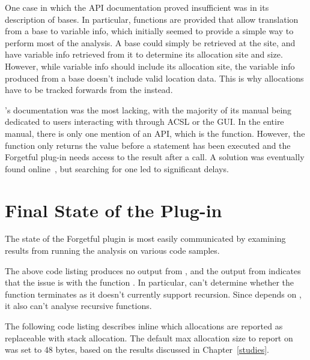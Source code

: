 One case in which the API documentation proved insufficient was in its description of bases. In particular, functions are provided that allow translation from a base to variable info, which initially seemed to provide a simple way to perform most of the analysis. A base could simply be retrieved at the \free{} site, and have variable info retrieved from it to determine its allocation site and size. However, while variable info should include its allocation site, the variable info produced from a base doesn't include valid location data. This is why allocations have to be tracked forwards from the \malloc{} instead.

's documentation was the most lacking, with the majority of its manual being dedicated to users interacting with  through ACSL or the  GUI\@. In the entire manual, there is only one mention of an  API, which is the  function. However, the  function only returns the value before a statement has been executed and the Forgetful plug-in needs access to the result after a \malloc{} call. A solution was eventually found online~\cite{foldstate}, but searching for one led to significant delays.

\section{Final State of the Plug-in}\label{pluginstate}

The state of the Forgetful plugin is most easily communicated by examining results from running the analysis on various code samples.



The above code listing produces no output from , and the output from  indicates that the issue is with the function . In particular,  can't determine whether the function terminates as it doesn't currently support recursion. Since  depends on , it also can't analyse recursive functions.

The following code listing describes inline which allocations are reported as replaceable with stack allocation. The default max allocation size to report on was set to 48 bytes, based on the results discussed in Chapter~\ref{studies}.



